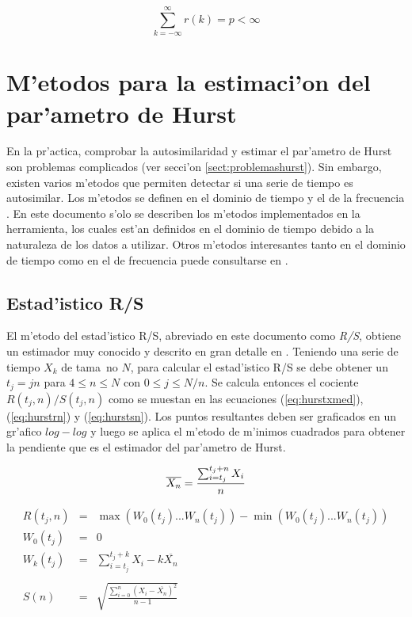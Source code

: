 \begin{equation}
\sum_{k = -\infty}^{\infty}{r(k)} = p < \infty
\end{equation}

\section{M'etodos para la estimaci'on del par'ametro de Hurst}
\label{sect:metodos}

En la pr'actica, comprobar la autosimilaridad y estimar el par'ametro de Hurst
son problemas complicados (ver secci'on \ref{sect:problemashurst}). Sin embargo,
existen varios m'etodos que permiten detectar si una serie de tiempo es
autosimilar. Los m'etodos se definen en el dominio de tiempo
\cite{Leland93onthe} \cite{MAVARStefano} y el de la frecuencia
\cite{MAVARStefano} \cite{556987} \cite{1296068}. En este documento s'olo se
describen los m'etodos implementados en la herramienta, los cuales est'an
definidos en el dominio de tiempo debido a la naturaleza de los datos a
utilizar. Otros m'etodos interesantes tanto en el dominio de tiempo como en el
de frecuencia puede consultarse en \cite{1296068}. 


\subsection{Estad'istico R/S} \label{subsect:rsstat}

El m'etodo del estad'istico R/S, abreviado en este documento como {\it R/S},
obtiene un estimador muy conocido y descrito en gran detalle en
\cite{Leland93onthe}. Teniendo una serie de tiempo $X_k$ de tama~no $N$, para
calcular el estad'istico R/S se debe obtener un $t_j = j n$ para 
$4 \le n \le N$ con $0 \le j \le N/n$. Se calcula entonces el cociente
$R(t_j,n)/S(t_j,n)$ como se muestan en las ecuaciones (\ref{eq:hurstxmed}),
(\ref{eq:hurstrn}) y (\ref{eq:hurstsn}). Los puntos resultantes deben ser
graficados en un gr'afico $log-log$ y luego se aplica el m'etodo de m'inimos
cuadrados para obtener la pendiente que es el estimador del par'ametro de Hurst.

\begin{equation} \label{eq:hurstxmed}
\overline{X_n} = \frac{{\sum_{i = t_j}^{t_j + n}{X_i}}}{n} \\
\end{equation}

\begin{eqnarray} \label{eq:hurstrn}
R(t_j,n) & = & \max (W_0(t_j) ... W_n(t_j)) - \min (W_0(t_j) ... W_n(t_j)) \\
W_0(t_j) & = & 0 \nonumber \\
W_k(t_j) & = & \sum_{i=t_j}^{t_j + k}{X_i - k \overline{X_n}} \nonumber \\
\nonumber \\
\label{eq:hurstsn}
S(n) & = & \sqrt{\frac{\sum_{i=0}^{n}{(X_i - \overline{X_n})^2}}{n-1}}
\end{eqnarray}

